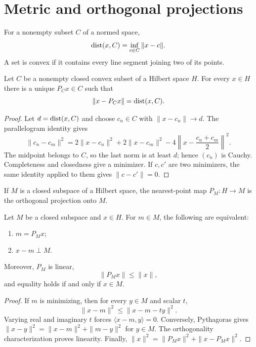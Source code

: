 \section{Metric and orthogonal projections}

\begin{notedefinition}
For a nonempty subset $C$ of a normed space,
\[
  \operatorname{dist}(x,C)=\inf_{c\in C}\|x-c\|.
\]
A set is convex if it contains every line segment joining two of its points.
\end{notedefinition}

\begin{notetheorem}
Let $C$ be a nonempty closed convex subset of a Hilbert space $H$.  For every
$x\in H$ there is a unique $P_Cx\in C$ such that
\[
  \|x-P_Cx\|=\operatorname{dist}(x,C).
\]
\end{notetheorem}

\begin{proof}
Let $d=\operatorname{dist}(x,C)$ and choose $c_n\in C$ with $\|x-c_n\|\to d$.  The
parallelogram identity gives
\[
 \|c_n-c_m\|^2
 =2\|x-c_n\|^2+2\|x-c_m\|^2
  -4\left\|x-\frac{c_n+c_m}{2}\right\|^2.
\]
The midpoint belongs to $C$, so the last norm is at least $d$; hence $(c_n)$
is Cauchy.  Completeness and closedness give a minimizer.  If $c,c'$ are two
minimizers, the same identity applied to them gives $\|c-c'\|=0$.
\end{proof}

\begin{notedefinition}
If $M$ is a closed subspace of a Hilbert space, the nearest-point map
$P_M\colon H\to M$ is the orthogonal projection onto $M$.
\end{notedefinition}

\begin{notetheorem}
Let $M$ be a closed subspace and $x\in H$.  For $m\in M$, the following are
equivalent:
\begin{enumerate}
  \item $m=P_Mx$;
  \item $x-m\perp M$.
\end{enumerate}
Moreover, $P_M$ is linear,
\[
  \|P_Mx\|\le\|x\|,
\]
and equality holds if and only if $x\in M$.
\end{notetheorem}

\begin{proof}
If $m$ is minimizing, then for every $y\in M$ and scalar $t$,
\[
  \|x-m\|^2\le\|x-m-ty\|^2.
\]
Varying real and imaginary $t$ forces $\langle x-m,y\rangle=0$.
Conversely, Pythagoras gives
$\|x-y\|^2=\|x-m\|^2+\|m-y\|^2$ for $y\in M$.
The orthogonality characterization proves linearity.  Finally,
$\|x\|^2=\|P_Mx\|^2+\|x-P_Mx\|^2$.
\end{proof}

